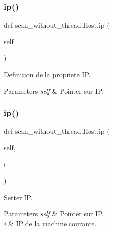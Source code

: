 \subsubsection{\texorpdfstring{ip()}{ip()}\hspace{0.1cm}{\footnotesize\ttfamily [1/2]}}
{\footnotesize\ttfamily def scan\+\_\+without\+\_\+thread.\+Host.\+ip (\begin{DoxyParamCaption}\item[{}]{self }\end{DoxyParamCaption})}



Definition de la propriete IP. 


\begin{DoxyParams}{Parameters}
{\em self} & Pointer sur IP. \\
\hline
\end{DoxyParams}
\hypertarget{classscan__without__thread_1_1Host_a98aba57c7d75d3ea42b43b9260bcf388}{}\label{classscan__without__thread_1_1Host_a98aba57c7d75d3ea42b43b9260bcf388} 
\subsubsection{\texorpdfstring{ip()}{ip()}\hspace{0.1cm}{\footnotesize\ttfamily [2/2]}}
{\footnotesize\ttfamily def scan\+\_\+without\+\_\+thread.\+Host.\+ip (\begin{DoxyParamCaption}\item[{}]{self,  }\item[{}]{i }\end{DoxyParamCaption})}



Setter IP. 


\begin{DoxyParams}{Parameters}
{\em self} & Pointer sur IP. \\
\hline
{\em i} & IP de la machine courante. \\
\hline
\end{DoxyParams}
\hypertarget{classscan__without__thread_1_1Host_a58944abb503f140faf7feee5a4ade3bb}{}\label{classscan__without__thread_1_1Host_a58944abb503f140faf7feee5a4ade3bb} 
